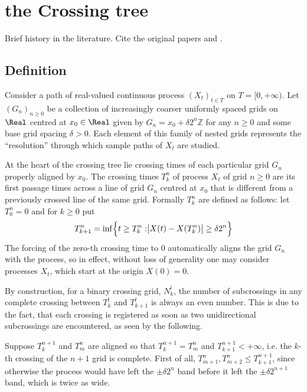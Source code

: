 
\section{the Crossing tree} %
\label{sec:the_crossing_tree}

Brief history in the literature. Cite the original papers \cite{jones2004}
and \cite{jonesshen2005}.

\subsection{Definition} %
\label{sub:definition}

Consider a path of real-valued continuous process $(X_t)_{t\in T}$ on $T = [0,+\infty)$.
Let $(G_n)_{n\geq0}$ be a collection of increasingly coarser uniformly spaced grids
on $\Real$ centred at $x_0\in \Real$ given by $G_n = x_0 + \delta 2^n \mathbb{Z}$
for any $n\geq 0$ and some base grid spacing $\delta>0$.\footnotemark
Each element of this family of nested grids represents the ``resolution'' through
which sample paths of $X_t$ are studied.

At the heart of the crossing tree lie crossing times of each particular grid $G_n$
properly aligned by $x_0$. The crossing times $T_k^n$ of process $X_t$ of grid $n\geq 0$
are its first passage times across a line of grid $G_n$ centred at $x_0$ that is
different from a previously crossed line of the same grid. Formally $T_k^n$ are
defined as follows: let $T_0^n=0$ and for $k\geq 0$ put
\[
T_{k+1}^n
= \inf \Bigl\{ t \geq T^n_k : \bigr | X(t) - X(T^n_k) \bigr | \geq \delta 2^n \Bigr\}
\]
The forcing of the zero-th crossing time to $0$ automatically aligns the grid $G_n$
with the process, so in effect, without loss of generality one may consider processes
$X_t$, which start at the origin $X(0) = 0$.

By construction, for a binary crossing grid, $N^l_k$, the number of subcrossings in
any complete crossing between $T^l_k$ and $T^l_{k+1}$ is always an even number. This
is due to the fact, that each crossing is registered as soon as two unidirectional
subcrossings are encountered, as seen by the following.

Suppose $T^{n+1}_k$ and $T^n_m$ are aligned so that $T^{n+1}_k=T^n_m$ and
$T^{n+1}_{k+1}<+\infty$, i.e. the $k$-th crossing of the $n+1$ grid is complete.
First of all, $T^n_{m+1}, T^n_{m+2} \leq T^{n+1}_{k+1}$, since otherwise the process
would have left the $\pm \delta 2^n$ band before it left the $\pm \delta 2^{n+1}$
band, which is twice as wide.

